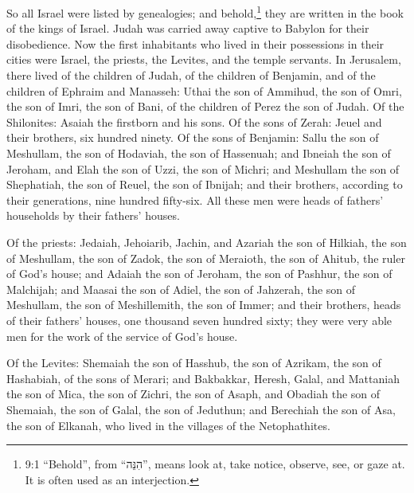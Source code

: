 \mychapter{} \myverse*{}So all Israel were listed by genealogies; and behold,\footnote{9:1 “Behold”, from “הִנֵּה”, means look at, take notice, observe, see, or gaze at. It is
	often used as an interjection.} they are written in the book of the kings of Israel. Judah was
carried away captive to Babylon for their disobedience.
\myverse{}Now the first inhabitants who lived in their possessions in their cities were
Israel, the priests, the Levites, and the temple servants.
\myverse{}In Jerusalem, there lived of the children of Judah, of the children of Benjamin,
and of the children of Ephraim and Manasseh:
\myverse{}Uthai the son of Ammihud, the son of Omri, the son of Imri, the son of Bani,
of the children of Perez the son of Judah.
\myverse{}Of the Shilonites: Asaiah the firstborn and his sons.
\myverse{}Of the sons of Zerah: Jeuel and their brothers, six hundred ninety.
\myverse{}Of the sons of Benjamin: Sallu the son of Meshullam, the son of Hodaviah, the
son of Hassenuah;
\myverse{}and Ibneiah the son of Jeroham, and Elah the son of Uzzi, the son of Michri;
and Meshullam the son of Shephatiah, the son of Reuel, the son of Ibnijah;
\myverse{}and their brothers, according to their generations, nine hundred fifty-six.
All these men were heads of fathers’ households by their fathers’ houses.

\myverse{}Of the priests: Jedaiah, Jehoiarib, Jachin,
\myverse{}and Azariah the son of Hilkiah, the son of Meshullam, the son of Zadok, the
son of Meraioth, the son of Ahitub, the ruler of God’s house;
\myverse{}and Adaiah the son of Jeroham, the son of Pashhur, the son of Malchijah; and
Maasai the son of Adiel, the son of Jahzerah, the son of Meshullam, the son of Meshillemith, the son of
Immer;
\myverse{}and their brothers, heads of their fathers’ houses, one thousand seven hundred
sixty; they were very able men for the work of the service of God’s house.

\myverse{}Of the Levites: Shemaiah the son of Hasshub, the son of Azrikam,
the son of Hashabiah, of the sons of Merari;
\myverse{}and Bakbakkar, Heresh, Galal, and Mattaniah the son of Mica, the son of Zichri,
the son of Asaph,
\myverse{}and Obadiah the son of Shemaiah, the son of Galal, the son of Jeduthun; and
Berechiah the son of Asa, the son of Elkanah, who lived in the villages of the Netophathites.

